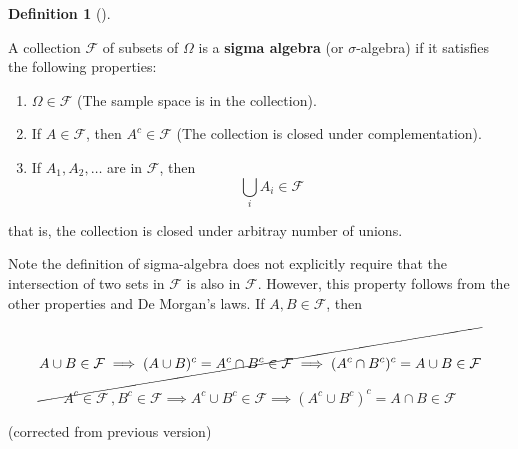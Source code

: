 \documentclass[
  letterpaper,
  DIV=11,
  numbers=noendperiod]{scrreport}
\providecommand{\tightlist}{%
  \setlength{\itemsep}{0pt}\setlength{\parskip}{0pt}}
\theoremstyle{definition}
\theoremstyle{plain}
\theoremstyle{definition}
\newtheorem{definition}{Definition}[chapter]
\theoremstyle{plain}
\theoremstyle{remark}
\begin{document}
\begin{tcolorbox}[enhanced jigsaw, breakable, opacityback=0, leftrule=.75mm, colback=white, bottomtitle=1mm, coltitle=black, toptitle=1mm, titlerule=0mm, bottomrule=.15mm, colframe=quarto-callout-note-color-frame, title={Sigma Algebra}, opacitybacktitle=0.6, colbacktitle=quarto-callout-note-color!10!white, rightrule=.15mm, arc=.35mm, toprule=.15mm, left=2mm]

\begin{definition}[]\protect\hypertarget{def-sigma-algebra}{}\label{def-sigma-algebra}

A collection \(\mathcal{F}\) of subsets of \(\Omega\) is a \textbf{sigma
algebra} (or \(\sigma\)-algebra) if it satisfies the following
properties:

\begin{enumerate}
\def\labelenumi{\arabic{enumi}.}
\tightlist
\item
  \(\Omega \in \mathcal{F}\) (The sample space is in the collection).
\item
  If \(A \in \mathcal{F}\), then \(A^c \in \mathcal{F}\) (The collection
  is closed under complementation).
\item
  If \(A_1, A_2, \dots\) are in \(\mathcal{F}\), then \[
  \bigcup_i A_i \in \mathcal{F}
  \]
\end{enumerate}

that is, the collection is closed under arbitray number of unions.

\end{definition}

\end{tcolorbox}

Note the definition of sigma-algebra does not explicitly require that
the intersection of two sets in \(\mathcal F\) is also in
\(\mathcal F\). However, this property follows from the other properties
and De Morgan's laws. If \(A,B \in \mathcal F\), then

\[
\cancel{A\cup B \in \mathcal F \implies (A\cup B)^c = A^c \cap B^c \in \mathcal F \implies (A^c \cap B^c)^c = A \cup B \in \mathcal F}
\]

\[
A^c \in \mathcal F\,,B^c \in \mathcal F
\implies A^c \cup B^c \in \mathcal F
\implies (A^c \cup B^c)^c= A \cap B\in \mathcal F
\]

(corrected from previous version)
\end{document}
